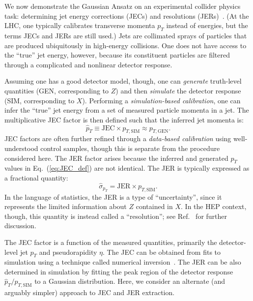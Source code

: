 \documentclass[prl,twocolumn,superscriptaddress,longbibliography,preprintnumbers,floatfix,nofootinbib]{revtex4-1}
\DeclareRobustCommand{\Eq}[1]{Eq.~(\ref{eq:#1})}
\DeclareRobustCommand{\Ref}[1]{Ref.~\cite{#1}}
\newcommand{\GaussianAnsatz}{{Gaussian Ansatz}\xspace}
\begin{document}
We now demonstrate the \GaussianAnsatz on an experimental collider physics task: determining jet energy corrections (JECs) and resolutions (JERs)~\cite{Khachatryan_2017}.
%
(At the LHC, one typically calibrates transverse momenta $p_T$ instead of energies, but the terms JECs and JERs are still used.)
%
Jets are collimated sprays of particles that are produced ubiquitously in high-energy collisions.
%
One does not have access to the ``true'' jet energy, however, because its constituent particles are filtered through a complicated and nonlinear detector response.


Assuming one has a good detector model, though, one can \emph{generate} truth-level quantities (GEN, corresponding to $Z$) and then \emph{simulate} the detector response (SIM, corresponding to $X$).
%
Performing a \emph{simulation-based calibration}, one can infer the ``true'' jet energy from a set of measured particle momenta in a jet.
%
The multiplicative JEC factor is then defined such that the inferred jet momenta is:
%
\begin{equation}
\label{eq:JEC_def}
\hat{p}_{T} \equiv \text{JEC} \times p_{T,\text{SIM}}\approx p_{T,\text{GEN}}.
\end{equation}
%
JEC factors are often further refined through a \emph{data-based calibration} using well-understood control samples, though this is separate from the procedure considered here.
%
The JER factor arises because the inferred and generated $p_T$ values in \Eq{JEC_def} are not identical.
%
The JER is typically expressed as a fractional quantity:
%
\begin{equation}
\label{eq:JER_def}
\hat{\sigma}_{p_{T}} = \text{JER} \times p_{T,\text{SIM}}.
\end{equation}
%
In the language of statistics, the JER is a type of ``uncertainty'', since it represents the limited information about $Z$ contained in $X$.
%
In the HEP context, though, this quantity is instead called a ``resolution''; see \Ref{priordependence} for further discussion.


The JEC factor is a function of the measured quantities, primarily the detector-level jet $p_T$ and pseudorapidity $\eta$.
%
The JEC can be obtained from fits to simulation \cite{2011jes,CMS:2016lmd, ATLAS:2017bje,ATLAS:2014hvo,ATLAS:2019oxp} using a technique called numerical inversion~\cite{Cukierman_2017}.
%
The JER can be also determined in simulation by fitting the peak region of the detector response $\hat{p}_T/p_{T,\text{SIM}}$ to a Gaussian distribution.  
%
Here, we consider an alternate (and arguably simpler) approach to JEC and JER extraction.
\end{document}
